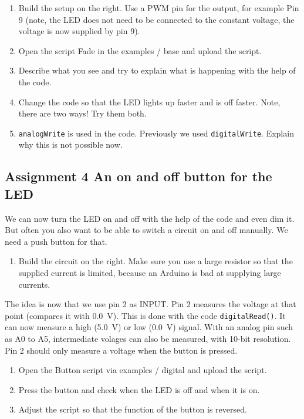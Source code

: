 \documentclass{arduino}
\begin{document}
\begin{enumerate}[label={\alph*})]
\item Build the setup on the right. Use a PWM pin for the output, for example Pin 9 (note, the LED does not need to be connected to the constant voltage, the voltage is now supplied by pin 9).

\item Open the script Fade in the examples / base and upload the script.

\item Describe what you see and try to explain what is happening with the help of the code.

\item Change the code so that the LED lights up faster and is off faster. Note, there are two ways! Try them both.

\item \lstinline{analogWrite} is used in the code. Previously we used \lstinline{digitalWrite}. Explain why this is not possible now.
\end{enumerate}

\subsection{Assignment 4 An on and off button for the LED}


We can now turn the LED on and off with the help of the code and even dim it. But often you also want to be able to switch a circuit on and off manually. We need a push button for that.

\begin{enumerate}[label={\alph*})]
\item Build the circuit on the right. Make sure you use a large resistor so that the supplied current is limited, because an Arduino is bad at supplying large currents.
\end{enumerate}

The idea is now that we use pin 2 as INPUT. Pin 2 measures the voltage at that point (compares it with \SI{0.0}{\volt}). This is done with the code \lstinline{digitalRead()}. It can now measure a high (\SI{5.0}{\volt}) or low (\SI{0.0}{\volt}) signal. With an analog pin such as A0 to A5, intermediate volages can also be measured, with 10-bit resolution. Pin 2 should only measure a voltage when the button is pressed.

\begin{enumerate}[label={\alph*})]
\item Open the Button script via examples / digital and upload the script.

\item Press the button and check when the LED is off and when it is on.

\item Adjust the script so that the function of the button is reversed.
\end{enumerate}
\end{document}
